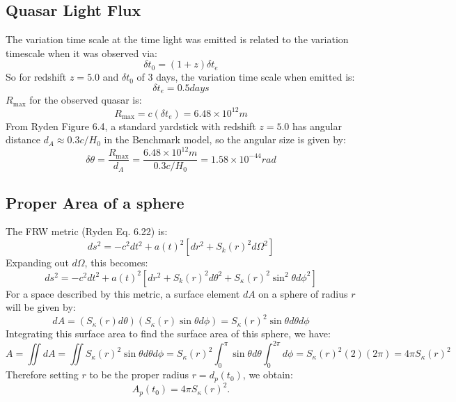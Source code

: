 \subsection{Quasar Light Flux}
The variation time scale at the time light was emitted is related to the variation timescale when it was observed via:
\begin{equation}
    \delta t_0 = (1 + z)\delta t_e
\end{equation}
So for redshift $z = 5.0$ and $\delta t_0$ of 3 days, the variation time scale when emitted is:
\begin{equation}
    \boxed{\delta t_e = 0.5 \si{days}}
\end{equation}
$R_{\text{max}}$ for the observed quasar is:
\begin{equation}
    \boxed{R_{\text{max}} = c(\delta t_e) = 6.48 \times 10^{12} \si{m}}
\end{equation}
From Ryden Figure 6.4, a standard yardstick with redshift $z = 5.0$ has angular distance $d_A \approx 0.3c/H_0$ in the Benchmark model, so the angular size is given by:
\begin{equation}
    \boxed{\delta \theta = \frac{R_{\text{max}}}{d_A} = \frac{6.48 \times 10^{12} \si{m}}{0.3c/H_0} = 1.58 \times 10^{-44}\si{rad}}
\end{equation}


\subsection{Proper Area of a sphere}
The FRW metric (Ryden Eq. 6.22) is:
\begin{equation}
    ds^2 = -c^2dt^2 + a(t)^2[dr^2 + S_k(r)^2d\Omega^2]
\end{equation}
Expanding out $d\Omega$, this becomes:
\begin{equation}
    ds^2 = -c^2dt^2 + a(t)^2[dr^2 + S_k(r)^2d\theta^2 + S_\kappa(r)^2\sin^2\theta d\phi^2]
\end{equation}
For a space described by this metric, a surface element $dA$ on a sphere of radius $r$ will be given by:
\begin{equation}
    dA = (S_\kappa(r)d\theta)(S_\kappa(r)\sin\theta d\phi) = S_\kappa(r)^2 \sin\theta d\theta d\phi
\end{equation}
Integrating this surface area to find the surface area of this sphere, we have:
\begin{equation}
    A = \iint dA = \iint S_\kappa(r)^2 \sin\theta d\theta d\phi = S_\kappa(r)^2 \int_{0}^{\pi}\sin\theta d\theta \int_{0}^{2\pi}d\phi = S_\kappa(r)^2(2)(2\pi) = 4\pi S_\kappa(r)^2
\end{equation}
Therefore setting $r$ to be the proper radius $r = d_p(t_0)$, we obtain:
\begin{equation}
    \boxed{A_p(t_0) = 4\pi S_\kappa(r)^2}.
\end{equation}

